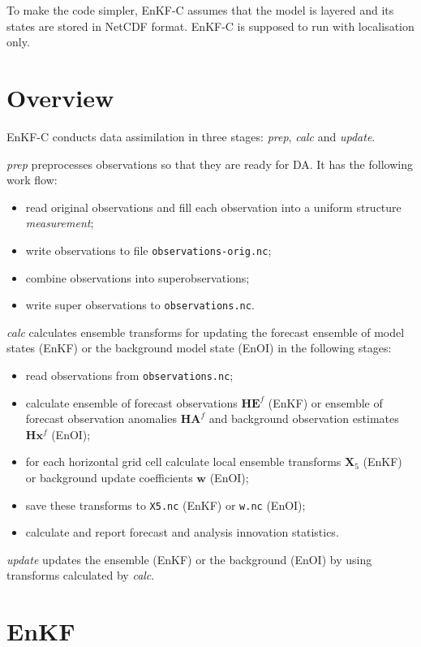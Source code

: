 \documentclass[11pt]{report}
\newcommand{\mb} {\mathbf}
\begin{document}
To make the code simpler, EnKF-C assumes that the model is layered and its states are stored in NetCDF format.
EnKF-C is supposed to run with localisation only.

\chapter{Overview}

EnKF-C conducts data assimilation in three stages: \emph{prep}, \emph{calc} and \emph{update}.

\emph{prep} preprocesses observations so that they are ready for DA.
It has the following work flow:
\begin{itemize}
\item read original observations and fill each observation into a uniform structure \emph{measurement};
\item write observations to file \verb|observations-orig.nc|;
\item combine observations into superobservations;
\item write super observations to \verb|observations.nc|.
\end{itemize}

\emph{calc} calculates ensemble transforms for updating the forecast ensemble of model states (EnKF) or the background model state (EnOI) in the following stages:
\begin{itemize}
\item read observations from \verb|observations.nc|;
\item calculate ensemble of forecast observations $\mb H \mb E^f$ (EnKF) or ensemble of forecast observation anomalies $\mb H \mb A^f$ and background observation estimates $\mb H \mb x^f$ (EnOI);
\item for each horizontal grid cell calculate local ensemble transforms $\mb X_5$ (EnKF) or background update coefficients $\mb w$ (EnOI);
\item save these transforms to \verb|X5.nc| (EnKF) or \verb|w.nc| (EnOI);
\item calculate and report forecast and analysis innovation statistics.
\end{itemize}

\emph{update} updates the ensemble (EnKF) or the background (EnOI) by using transforms calculated by \emph{calc}.

\chapter{EnKF}
\end{document}
